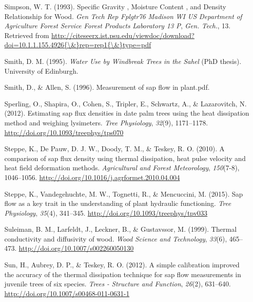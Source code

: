 \documentclass[11pt,twoside]{reedthesis}
\begin{document}
\hypertarget{ref-Simpson1993}{}
Simpson, W. T. (1993). Specific Gravity , Moisture Content , and Density
Relationship for Wood. \emph{Gen Tech Rep Fplgtr76 Madison WI US
Department of Agriculture Forest Service Forest Products Laboratory 13
P}, \emph{Gen. Tech.}, 13. Retrieved from
\href{http://citeseerx.ist.psu.edu/viewdoc/download?doi=10.1.1.155.4926\%7B/\&\%7Drep=rep1\%7B/\&\%7Dtype=pdf}{http://citeseerx.ist.psu.edu/viewdoc/download?doi=10.1.1.155.4926\{\textbackslash{}\&\}rep=rep1\{\textbackslash{}\&\}type=pdf}

\hypertarget{ref-Smith1995}{}
Smith, D. M. (1995). \emph{Water Use by Windbreak Trees in the Sahel}
(PhD thesis). University of Edinburgh.

\hypertarget{ref-Smith1996}{}
Smith, D., \& Allen, S. (1996). Measurement of sap flow in plant.pdf.

\hypertarget{ref-Sperling2012}{}
Sperling, O., Shapira, O., Cohen, S., Tripler, E., Schwartz, A., \&
Lazarovitch, N. (2012). Estimating sap flux densities in date palm trees
using the heat dissipation method and weighing lysimeters. \emph{Tree
Physiology}, \emph{32}(9), 1171--1178.
\url{http://doi.org/10.1093/treephys/tps070}

\hypertarget{ref-Steppe2010}{}
Steppe, K., De Pauw, D. J. W., Doody, T. M., \& Teskey, R. O. (2010). A
comparison of sap flux density using thermal dissipation, heat pulse
velocity and heat field deformation methods. \emph{Agricultural and
Forest Meteorology}, \emph{150}(7-8), 1046--1056.
\url{http://doi.org/10.1016/j.agrformet.2010.04.004}

\hypertarget{ref-Steppe2015}{}
Steppe, K., Vandegehuchte, M. W., Tognetti, R., \& Mencuccini, M.
(2015). Sap flow as a key trait in the understanding of plant hydraulic
functioning. \emph{Tree Physiology}, \emph{35}(4), 341--345.
\url{http://doi.org/10.1093/treephys/tpv033}

\hypertarget{ref-Suleiman1999}{}
Suleiman, B. M., Larfeldt, J., Leckner, B., \& Gustavssor, M. (1999).
Thermal conductivity and diffusivity of wood. \emph{Wood Science and
Technology}, \emph{33}(6), 465--473.
\url{http://doi.org/10.1007/s002260050130}

\hypertarget{ref-Sun2012}{}
Sun, H., Aubrey, D. P., \& Teskey, R. O. (2012). A simple calibration
improved the accuracy of the thermal dissipation technique for sap flow
measurements in juvenile trees of six species. \emph{Trees - Structure
and Function}, \emph{26}(2), 631--640.
\url{http://doi.org/10.1007/s00468-011-0631-1}
\end{document}

